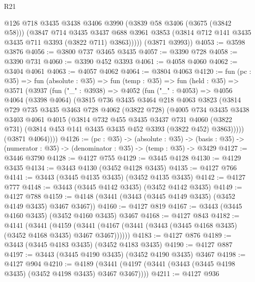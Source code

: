 \begin{lexlean}{R21}
\begin{coremodule}
            @126
            @718
            @3435
            @3438
            @3406
            @3990
            (@3839 @58 @3406 (@3675 (@3842 @58)))
            (@3847
              @714
              @3435
              @3437
              @688
              @3961
              @3853
              (@3814 @712 @141 @3435 @3435 @711 @3393 (@3822 @711) @3863)))))
      (@3871 @3993))
@4053 := @3598 @3876
@4056 := @3800 @737 @3465 @3435
@4057 := @3390 @728
@4058 := @3390 @731
@4060 := @3390 @452 @3393
@4061 := @4058 @4060
@4062 := @3404 @4061
@4063 := @4057 @4062
@4064 := @3804 @4063
@4120 := fun (pc : @35) =>
  fun (absolute : @35) =>
  fun (temp : @35) =>
  fun (held : @35) =>
  @3571
    (@3937
      (fun ("_" : @3938) =>
      @4052
        (fun ("_" : @4053) =>
        @4056
          @4064
          (@3398 @4064)
          (@3815
            @736
            @3435
            @3464
            @218
            @4063
            @3823
            (@3814
              @729
              @735
              @3435
              @3463
              @728
              @4062
              (@3822 @728)
              (@4005
                @734
                @3435
                @3438
                @3403
                @4061
                @4015
                (@3814
                  @732
                  @455
                  @3435
                  @3437
                  @731
                  @4060
                  (@3822 @731)
                  (@3814 @453 @141 @3435 @3435 @452 @3393 (@3822 @452) @3863)))))
          (@3871 @4064))))
@4126 := (pc : @35) ->
  (absolute : @35) ->
  (basis : @35) -> (numerator : @35) -> (denominator : @35) -> (temp : @35) -> @3429
@4127 := @3446 @3790
@4128 := @4127 @755
@4129 := @3445 @4128
@4130 := @4129 @3435
@4134 := @3443 @4130 (@3452 @4128 @3435)
@4135 := @4127 @766
@4141 := @3443 (@3445 @4135 @3435) (@3452 @4135 @3435)
@4142 := @4127 @777
@4148 := @3443 (@3445 @4142 @3435) (@3452 @4142 @3435)
@4149 := @4127 @788
@4159 := @4148 (@3441 (@3443 (@3445 @4149 @3435) (@3452 @4149 @3435) @3467 @3467))
@4160 := @4127 @819
@4167 := @3443 (@3445 @4160 @3435) (@3452 @4160 @3435) @3467
@4168 := @4127 @843
@4182 := @4141
    (@3441
      (@4159 (@3441 (@4167 (@3441 (@3443 (@3445 @4168 @3435) (@3452 @4168 @3435) @3467 @3467))))))
@4183 := @4127 @876
@4189 := @3443 (@3445 @4183 @3435) (@3452 @4183 @3435)
@4190 := @4127 @887
@4197 := @3443 (@3445 @4190 @3435) (@3452 @4190 @3435) @3467
@4198 := @4127 @904
@4210 := @4189 (@3441 (@4197 (@3441 (@3443 (@3445 @4198 @3435) (@3452 @4198 @3435) @3467 @3467))))
@4211 := @4127 @936

\end{coremodule}
\end{lexlean}

